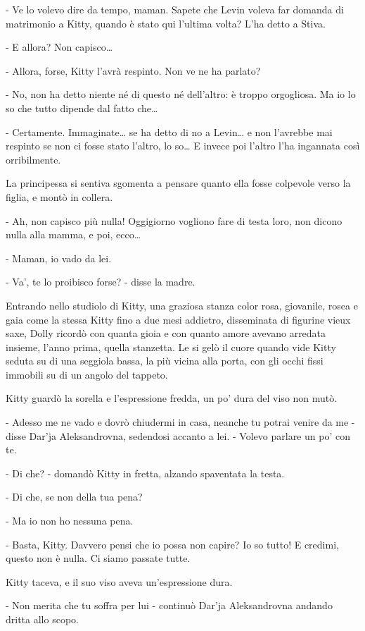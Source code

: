 - Ve lo volevo dire da tempo, maman. Sapete che Levin voleva far domanda di matrimonio a Kitty, quando è stato qui l'ultima volta? L'ha detto a Stiva. 

- E allora? Non capisco\ldots{} 

- Allora, forse, Kitty l'avrà respinto. Non ve ne ha parlato? 

- No, non ha detto niente né di questo né dell'altro: è troppo orgogliosa. Ma io lo so che tutto dipende dal fatto che\ldots{} 

- Certamente. Immaginate\ldots{} se ha detto di no a Levin\ldots{} e non l'avrebbe mai respinto se non ci fosse stato l'altro, lo so\ldots{} E invece poi l'altro l'ha ingannata così orribilmente. 

La principessa si sentiva sgomenta a pensare quanto ella fosse colpevole verso la figlia, e montò in collera. 

- Ah, non capisco più nulla! Oggigiorno vogliono fare di testa loro, non dicono nulla alla mamma, e poi, ecco\ldots{} 

- Maman, io vado da lei. 

- Va', te lo proibisco forse? - disse la madre. 

Entrando nello studiolo di Kitty, una graziosa stanza color rosa, giovanile, rosea e gaia come la stessa Kitty fino a due mesi addietro, disseminata di figurine vieux saxe, Dolly ricordò con quanta gioia e con quanto amore avevano arredata insieme, l'anno prima, quella stanzetta. Le si gelò il cuore quando vide Kitty seduta su di una seggiola bassa, la più vicina alla porta, con gli occhi fissi immobili su di un angolo del tappeto. 

Kitty guardò la sorella e l'espressione fredda, un po' dura del viso non mutò. 

- Adesso me ne vado e dovrò chiudermi in casa, neanche tu potrai venire da me - disse Dar'ja Aleksandrovna, sedendosi accanto a lei. - Volevo parlare un po' con te. 

- Di che? - domandò Kitty in fretta, alzando spaventata la testa. 

- Di che, se non della tua pena? 

- Ma io non ho nessuna pena. 

- Basta, Kitty. Davvero pensi che io possa non capire? Io so tutto! E credimi, questo non è nulla. Ci siamo passate tutte. 

Kitty taceva, e il suo viso aveva un'espressione dura. 

- Non merita che tu soffra per lui - continuò Dar'ja Aleksandrovna andando dritta allo scopo. 

